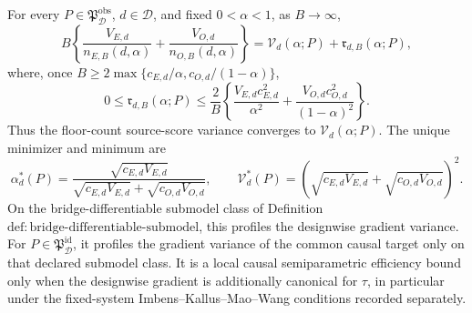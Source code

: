 For every \(P\in\mathfrak P_{\mathcal D}^{\mathrm{obs}}\), \(d\in\mathcal D\), and fixed \(0<\alpha<1\), as \(B\to\infty\),
\[
B\left\{\frac{V_{E,d}}{n_{E,B}(d,\alpha)}+\frac{V_{O,d}}{n_{O,B}(d,\alpha)}\right\}
=\mathcal V_d(\alpha;P)+\mathfrak r_{d,B}(\alpha;P),
\]
where, once \(B\ge2\max\{c_{E,d}/\alpha,c_{O,d}/(1-\alpha)\}\),
\[
0\le\mathfrak r_{d,B}(\alpha;P)\le \frac2B\left\{
\frac{V_{E,d}c_{E,d}^2}{\alpha^2}+
\frac{V_{O,d}c_{O,d}^2}{(1-\alpha)^2}\right\}.
\]
Thus the floor-count source-score variance converges to \(\mathcal V_d(\alpha;P)\). The unique minimizer and minimum are
\[
\alpha_d^*(P)=\frac{\sqrt{c_{E,d}V_{E,d}}}{\sqrt{c_{E,d}V_{E,d}}+\sqrt{c_{O,d}V_{O,d}}},
\qquad
\mathcal V_d^*(P)=\left(\sqrt{c_{E,d}V_{E,d}}+\sqrt{c_{O,d}V_{O,d}}\right)^2.
\]
On the bridge-differentiable submodel class of Definition~\(\mathrm{def{:}bridge\text{-}differentiable\text{-}submodel}\), this profiles the designwise gradient variance. For \(P\in\mathfrak P_{\mathcal D}^{\mathrm{id}}\), it profiles the gradient variance of the common causal target only on that declared submodel class. It is a local causal semiparametric efficiency bound only when the designwise gradient is additionally canonical for \(\tau\), in particular under the fixed-system Imbens--Kallus--Mao--Wang conditions recorded separately.